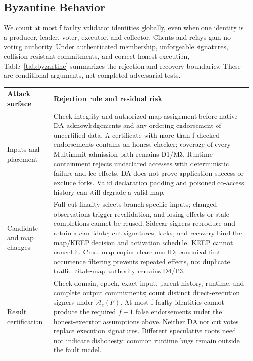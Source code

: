 \subsection{Byzantine Behavior}
\label{sec:byzantine}

We count at most f faulty validator identities globally, even when one identity is a producer, leader, voter, executor, and collector. Clients and relays gain no voting authority. Under authenticated membership, unforgeable signatures, collision-resistant commitments, and correct honest execution, Table~\ref{tab:byzantine} summarizes the rejection and recovery boundaries. These are conditional arguments, not completed adversarial tests.

\begin{table}[t]
\centering
\small
\renewcommand{\arraystretch}{1.12}
\begin{tabularx}{\textwidth}{@{}>{\raggedright\arraybackslash}p{}X@{}}
\toprule
Attack surface & Rejection rule and residual risk \\
\midrule
Inputs and placement &
Check integrity and authorized-map assignment before native DA acknowledgements and any ordering endorsement of uncertified data. A certificate with more than f checked endorsements contains an honest checker; coverage of every Multimmit admission path remains D1/M3. Runtime containment rejects undeclared accesses with deterministic failure and fee effects. DA does not prove application success or exclude forks. Valid declaration padding and poisoned co-access history can still degrade a valid map. \citep[Sections 4--5]{autobahn} \\
\midrule
Candidate and map changes &
Full cut finality selects branch-specific inputs; changed observations trigger revalidation, and losing effects or stale completions cannot be reused. Sidecar signers reproduce and retain a candidate; cut signatures, locks, and recovery bind the map/KEEP decision and activation schedule. KEEP cannot cancel it. Cross-map copies share one ID; canonical first-occurrence filtering prevents repeated effects, not duplicate traffic. Stale-map authority remains D4/P3. \citep[Appendix A.4]{autobahn} \\
\midrule
Result certification &
Check domain, epoch, exact input, parent history, runtime, and complete output commitments; count distinct direct-execution signers under \(\mathcal A_e(F)\). At most f faulty identities cannot produce the required \(f+1\) false endorsements under the honest-executor assumptions above. Neither DA nor cut votes replace execution signatures. Different speculative roots need not indicate dishonesty; common runtime bugs remain outside the fault model. \\

\end{tabularx}
\end{table}
